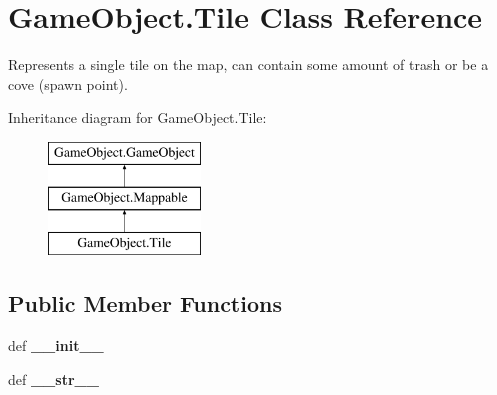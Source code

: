 \hypertarget{classGameObject_1_1Tile}{\section{\-Game\-Object.\-Tile \-Class \-Reference}
\label{classGameObject_1_1Tile}
}


\-Represents a single tile on the map, can contain some amount of trash or be a cove (spawn point).  


\-Inheritance diagram for \-Game\-Object.\-Tile\-:\begin{figure}[H]
\begin{center}
\leavevmode
\includegraphics[height=3.000000cm]{classGameObject_1_1Tile}
\end{center}
\end{figure}
\subsection*{\-Public \-Member \-Functions}
\begin{DoxyCompactItemize}
\item 
\hypertarget{classGameObject_1_1Tile_a5977843375e8407daf38d95583c699e0}{def {\bfseries \-\_\-\-\_\-init\-\_\-\-\_\-}}\label{classGameObject_1_1Tile_a5977843375e8407daf38d95583c699e0}

\item 
\hypertarget{classGameObject_1_1Tile_a9ec06dac5d771065df5d0651072897db}{def {\bfseries \-\_\-\-\_\-str\-\_\-\-\_\-}}\label{classGameObject_1_1Tile_a9ec06dac5d771065df5d0651072897db}

\end{DoxyCompactItemize}

